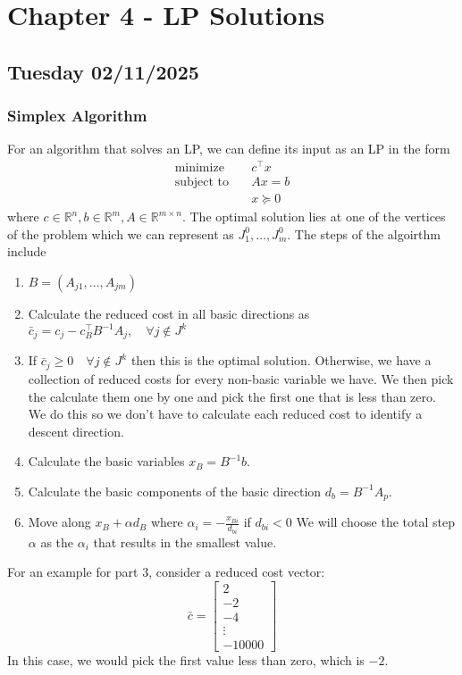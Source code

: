 \section{Chapter 4 - LP Solutions}
\subsection{Tuesday 02/11/2025}
\subsubsection{Simplex Algorithm}
For an algorithm that solves an LP, we can define its input as an LP in the form
\begin{align}
  \text{minimize} & \quad c^\top x \\
  \text{subject to} & \quad Ax = b \\
  & \quad x \succeq 0
\end{align}
where $c \in \mathbb{R}^n, b \in \mathbb{R}^m, A \in \mathbb{R}^{m \times n}$.
The optimal solution lies at one of the vertices of the problem which we can represent as $J_1^0, \dots, J_m^0$.
The steps of the algoirthm include
\begin{enumerate}
    \item $B = (A_{j1}, \dots, A_{jm})$
    \item Calculate the reduced cost in all basic directions as 
          $\bar{c}_j = c_j - c_B^\top B^{-1} A_j, \quad \forall j \notin J^k$
    \item If $\bar{c}_j \geq 0 \quad \forall j \notin J^k$ then this is the optimal solution.
          Otherwise, we have a collection of reduced costs for every non-basic variable we have.
          We then pick the calculate them one by one and pick the first one that is less than zero.
          We do this so we don't have to calculate each reduced cost to identify a descent direction.
    \item Calculate the basic variables $x_B = B^{-1} b$.
    \item Calculate the basic components of the basic direction $d_b = B^{-1} A_p$.
    \item Move along $x_B + \alpha d_B$ where $\alpha_i = -\frac{x_{B i}}{d_{b i}}$ if $d_{b i} < 0$
          We will choose the total step $\alpha$ as the $\alpha_i$ that results in the smallest value.
\end{enumerate}
For an example for part 3, consider a reduced cost vector:
\[
\bar{c} = \begin{bmatrix}
2 \\
-2 \\
-4 \\
\vdots \\
-10000
\end{bmatrix}
\]
In this case, we would pick the first value less than zero, which is $-2$.

